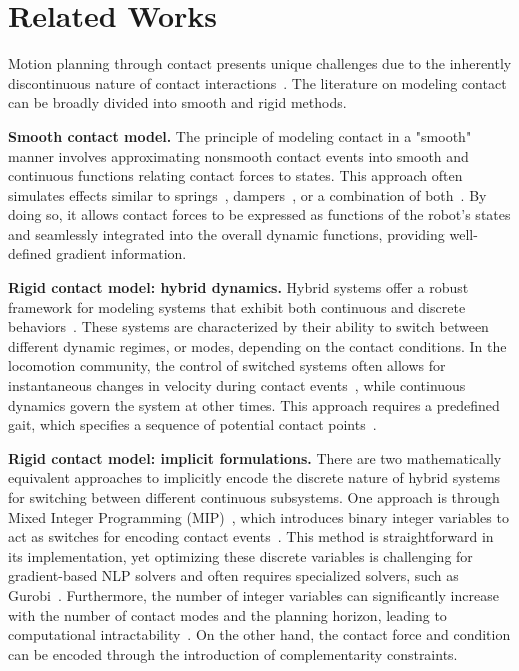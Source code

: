 \section{Related Works}
\label{sec:relatedworks}
Motion planning through contact presents unique challenges due to the inherently discontinuous nature of contact interactions~\cite{TRO-WENSING-2024,TRO-LELIDEC-2024}. The literature on modeling contact can be broadly divided into smooth and rigid methods. 

\textbf{Smooth contact model. }
The principle of modeling contact in a "smooth" manner involves approximating nonsmooth contact events into smooth and continuous functions relating contact forces to states. This approach often simulates effects similar to springs~\cite{JOB-BLICKHAN-1989}, dampers~\cite{TSMC-MARHEFKA-1999}, or a combination of both~\cite{RAL-NEUNERT-2017,RAL-NEUNERT-2018}. By doing so, it allows contact forces to be expressed as functions of the robot's states and seamlessly integrated into the overall dynamic functions, providing well-defined gradient information.

\textbf{Rigid contact model: hybrid dynamics. } Hybrid systems offer a robust framework for modeling systems that exhibit both continuous and discrete behaviors~\cite{CSM-GOEBEL-2009}. These systems are characterized by their ability to switch between different dynamic regimes, or modes, depending on the contact conditions.
In the locomotion community, the control of switched systems often allows for instantaneous changes in velocity during contact events~\cite{OCS2,HUMANOIDS-FARSHIDIAN-2017,IFAC-FARSHIDIAN20171463}, while continuous dynamics govern the system at other times. This approach requires a predefined gait, which specifies a sequence of potential contact points~\cite{IROS-CHEETAH,ICRA-CHENG-2022,TRO-LOPES-2014}.

\textbf{Rigid contact model: implicit formulations.} 
There are two mathematically equivalent approaches to implicitly encode the discrete nature of hybrid systems for switching between different continuous subsystems. One approach is through Mixed Integer Programming (MIP)~\cite{SIAMReview-vielma-2015}, which introduces binary integer variables to act as switches for encoding contact events~\cite{ICHR-DEITS-2014, IROS-ACEITUNO-2017, RAL-ACEITUNO-2018}. This method is straightforward in its implementation, yet optimizing these discrete variables is challenging for gradient-based NLP solvers and often requires specialized solvers, such as Gurobi~\cite{gurobi}. Furthermore, the number of integer variables can significantly increase with the number of contact modes and the planning horizon, leading to computational intractability~\cite{SHIRAI-YUKI-2024, TAC-MARCUCCI-2021}. On the other hand, the contact force and condition can be encoded through the introduction of complementarity constraints.


